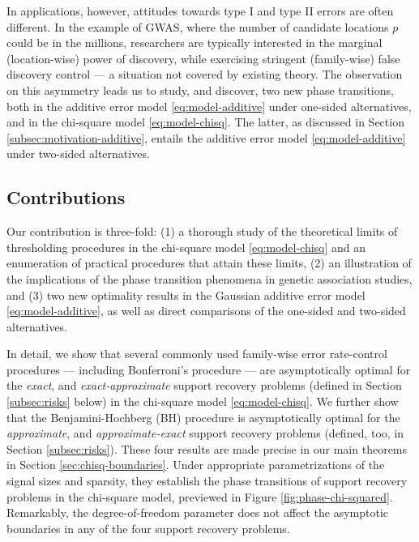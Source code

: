 In applications, however, attitudes towards type I and type II errors are often different.
In the example of GWAS, where the number of candidate locations $p$ could be in the millions, researchers are typically interested in the marginal (location-wise) power of discovery, while exercising stringent (family-wise) false discovery control --- a situation not covered by existing theory.
The observation on this asymmetry leads us to study, and discover, two new phase transitions, both in the additive error model \eqref{eq:model-additive} under one-sided alternatives, and in the chi-square model \eqref{eq:model-chisq}.
The latter, as discussed in Section \ref{subsec:motivation-additive}, entails the additive error model \eqref{eq:model-additive} under two-sided alternatives.

\subsection{Contributions}

Our contribution is three-fold: (1) a thorough study of the theoretical limits of thresholding procedures in the chi-square model \eqref{eq:model-chisq} and an enumeration of practical procedures that attain these limits, 
(2) an illustration of the implications of the phase transition phenomena in genetic association studies, and
(3) two new optimality results in the Gaussian additive error model \eqref{eq:model-additive}, as well as direct comparisons of the one-sided and two-sided alternatives. 

In detail, we show that several commonly used family-wise error rate-control procedures --- including Bonferroni's procedure \cite{dunn1961multiple} --- are asymptotically optimal for the \emph{exact}, and \emph{exact-approximate} support recovery problems (defined in Section \ref{subsec:risks} below) in the chi-square model \eqref{eq:model-chisq}.
We further show that the Benjamini-Hochberg (BH) procedure \cite{benjamini1995controlling} is asymptotically optimal for the \emph{approximate}, and \emph{approximate-exact} support recovery problems (defined, too, in Section \ref{subsec:risks}).
These four results are made precise in our main theorems in Section \ref{sec:chisq-boundaries}.
Under appropriate parametrizations of the signal sizes and sparsity, they establish the phase transitions of support recovery problems in the chi-square model, previewed in Figure \ref{fig:phase-chi-squared}.
Remarkably, the degree-of-freedom parameter does not affect the asymptotic boundaries in any of the four support recovery problems.

